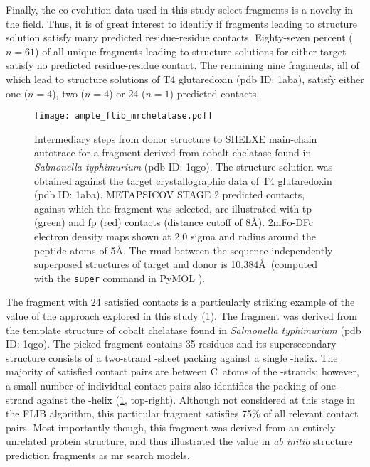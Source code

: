 Finally, the co-evolution data used in this study select fragments is a novelty in the field. Thus, it is of great interest to identify if fragments leading to structure solution satisfy many predicted residue-residue contacts. Eighty-seven percent ($n=61$) of all unique fragments leading to structure solutions for either target satisfy no predicted residue-residue contact. The remaining nine fragments, all of which lead to structure solutions of T4 glutaredoxin (\gls{pdb} ID: 1aba), satisfy either one ($n=4$), two ($n=4$) or 24 ($n=1$) predicted contacts. 

\begin{figure}[H]
	\centering
	\texttt{[image: ample\_flib\_mrchelatase.pdf]}
	\caption[Example of FLIB fragment to MR solution]{Intermediary steps from donor structure to SHELXE main-chain autotrace for a fragment derived from cobalt chelatase found in \textit{Salmonella typhimurium} (\gls{pdb} ID: 1qgo). The structure solution was obtained against the target crystallographic data of T4 glutaredoxin (\gls{pdb} ID: 1aba). METAPSICOV STAGE 2 predicted contacts, against which the fragment was selected, are illustrated with \acrlong{tp} (green) and \acrlong{fp} (red) contacts (distance cutoff of 8\AA). 2mFo-DFc electron density maps shown at 2.0 sigma and radius around the peptide atoms of 5\AA. The \gls{rmsd} between the sequence-independently superposed structures of target and donor is 10.384\AA\ (computed with the \texttt{super} command in PyMOL \cite{DeLano2002-hm}).}
	\label{fig:ample_flib_mrchelatase}
\end{figure}

The fragment with 24 satisfied contacts is a particularly striking example of the value of the approach explored in this study (\cref{fig:ample_flib_mrchelatase}). The fragment was derived from the template structure of cobalt chelatase found in \textit{Salmonella typhimurium} (\gls{pdb} ID: 1qgo). The picked fragment contains 35 residues and its supersecondary structure consists of a two-strand \textbeta-sheet packing against a single \textalpha-helix. The majority of satisfied contact pairs are between C\textbeta\ atoms of the \textbeta-strands; however, a small number of individual contact pairs also identifies the packing of one \textbeta-strand against the \textalpha-helix (\cref{fig:ample_flib_mrchelatase}, top-right). Although not considered at this stage in the FLIB algorithm, this particular fragment satisfies 75\% of all relevant contact pairs. Most importantly though, this fragment was derived from an entirely unrelated protein structure, and thus illustrated the value in \textit{ab initio} structure prediction fragments as \gls{mr} search models.

